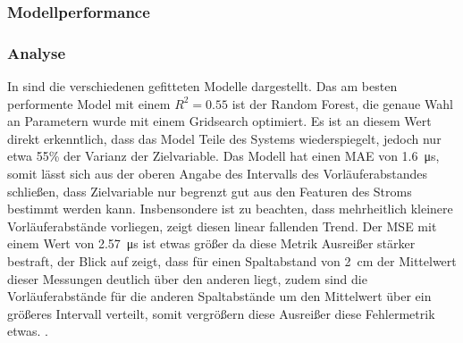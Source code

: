 \subsubsection{Modellperformance}

\begin{table}[h!]
\centering
\caption{Model Performance für die Vorhersage der Vorläuferabstände}
\label{tab:streamer_prec_distance}
\end{table}

\subsubsection{Analyse}
In  sind die verschiedenen gefitteten Modelle dargestellt. Das am besten performente Model mit einem \(R^2 = 0.55\) ist der Random Forest, die genaue Wahl an Parametern wurde mit einem Gridsearch optimiert. Es ist an diesem Wert direkt erkenntlich, dass das Model Teile des Systems wiederspiegelt, jedoch nur etwa 55\% der Varianz der Zielvariable. Das Modell hat einen MAE von \SI{1,6}{\micro\second}, somit lässt sich aus der oberen Angabe des Intervalls des Vorläuferabstandes schließen, dass Zielvariable nur begrenzt gut aus den Featuren des Stroms  bestimmt werden kann. Insbensondere ist zu beachten, dass mehrheitlich kleinere Vorläuferabstände vorliegen,  zeigt diesen linear fallenden Trend. Der MSE mit einem Wert von \SI{2,57}{\micro\second} ist etwas größer da diese Metrik Ausreißer stärker bestraft, der Blick auf  zeigt, dass für einen Spaltabstand von \SI{2}{\centi\meter} der Mittelwert dieser Messungen deutlich über den anderen liegt, zudem sind die Vorläuferabstände für die anderen Spaltabstände um den Mittelwert über ein größeres Intervall verteilt, somit vergrößern diese Ausreißer diese Fehlermetrik etwas.
.


